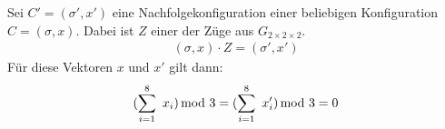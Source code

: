 \documentclass[12pt,a4paper, usenames, dvipsnames]{article}
\theoremstyle{mystyle}
\theoremstyle{definition}
\newcommand{\Gtwo}{\ensuremath{G_{2\times 2\times 2}}}
\begin{document}
Sei $C'=(\sigma', x')$ eine Nachfolgekonfiguration einer beliebigen Konfiguration $C=(\sigma, x)$.  Dabei ist $Z$ einer der Züge aus $\Gtwo$.  
\begin{align*}
{(\sigma, x) \cdot Z = (\sigma', x')}
\end{align*}
Für diese Vektoren $x$ und $x'$ gilt dann:
\begin{align*}
(\sum_{i= 1}^{8} \ x_i) \hspace*{-0.5em} \mod 3 = (\sum_{i= 1}^{8} \  x_i') \hspace*{-0.5em} \mod 3 = 0
\end{align*}



%
%
%
%
%
%
%
%
%
%
\end{document}

